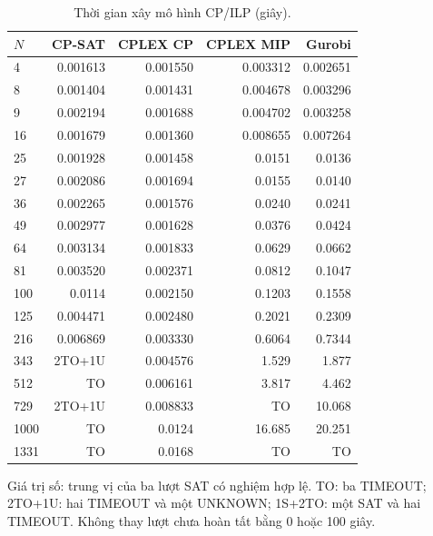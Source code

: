 \begin{table}[pos=H]
\centering
\small
\caption{Thời gian xây mô hình CP/ILP (giây).}
\label{tab:native_build}
\setlength{\tabcolsep}{4pt}
\begin{tabular}{@{}lrrrr@{}}
\toprule
$N$ & CP-SAT & CPLEX CP & CPLEX MIP & Gurobi \\
\midrule
4 & 0.001613 & 0.001550 & 0.003312 & 0.002651 \\
8 & 0.001404 & 0.001431 & 0.004678 & 0.003296 \\
9 & 0.002194 & 0.001688 & 0.004702 & 0.003258 \\
16 & 0.001679 & 0.001360 & 0.008655 & 0.007264 \\
25 & 0.001928 & 0.001458 & 0.0151 & 0.0136 \\
27 & 0.002086 & 0.001694 & 0.0155 & 0.0140 \\
36 & 0.002265 & 0.001576 & 0.0240 & 0.0241 \\
49 & 0.002977 & 0.001628 & 0.0376 & 0.0424 \\
64 & 0.003134 & 0.001833 & 0.0629 & 0.0662 \\
81 & 0.003520 & 0.002371 & 0.0812 & 0.1047 \\
100 & 0.0114 & 0.002150 & 0.1203 & 0.1558 \\
125 & 0.004471 & 0.002480 & 0.2021 & 0.2309 \\
216 & 0.006869 & 0.003330 & 0.6064 & 0.7344 \\
343 & 2TO+1U & 0.004576 & 1.529 & 1.877 \\
512 & TO & 0.006161 & 3.817 & 4.462 \\
729 & 2TO+1U & 0.008833 & TO & 10.068 \\
1000 & TO & 0.0124 & 16.685 & 20.251 \\
1331 & TO & 0.0168 & TO & TO \\
\bottomrule
\end{tabular}
\par\smallskip\begin{minipage}{\linewidth}\footnotesize Giá trị số: trung vị của ba lượt SAT có nghiệm hợp lệ. TO: ba TIMEOUT; 2TO+1U: hai TIMEOUT và một UNKNOWN; 1S+2TO: một SAT và hai TIMEOUT. Không thay lượt chưa hoàn tất bằng 0 hoặc 100 giây.\end{minipage}
\end{table}
